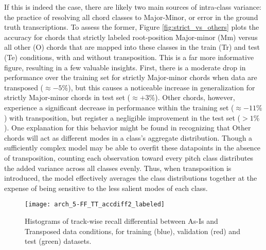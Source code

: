 If this is indeed the case, there are likely two main sources of intra-class variance: the practice of resolving all chord classes to Major-Minor, or error in the ground truth transcriptions.
To assess the former, Figure \ref{fig:strict_vs_others} plots the accuracy for chords that strictly labeled root-position Major-minor (Mm) versus all other (O) chords that are mapped into these classes in the train (Tr) and test (Te) conditions, with and without transposition.
This is a far more informative figure, resulting in a few valuable insights.
First, there is a moderate drop in performance over the training set for strictly Major-minor chords when data are transposed ($\approx -5\%$), but this causes a noticeable increase in generalization for strictly Major-minor chords in test set ($\approx +3\%$).
Other chords, however, experience a significant decrease in performance within the training set ($\approx -11\%$) with transposition, but register a negligible improvement in the test set ($>1\%$).
One explanation for this behavior might be found in recognizing that Other chords will act as different modes in a class's aggregate distribution.
Though a sufficiently complex model may be able to overfit these datapoints in the absence of transposition, counting each observation toward every pitch class distributes the added variance across all classes evenly.
Thus, when transposition is introduced, the model effectively averages the class distributions together at the expense of being sensitive to the less salient modes of each class.

\begin{figure}[!t]
\centering
\texttt{[image: arch\_5-FF\_TT\_accdiff2\_labeled]}
\caption{Histograms of track-wise recall differential between As-Is and Transposed data conditions, for training (blue), validation (red) and test (green) datasets.}
\label{fig:acc_diff}
\end{figure}

